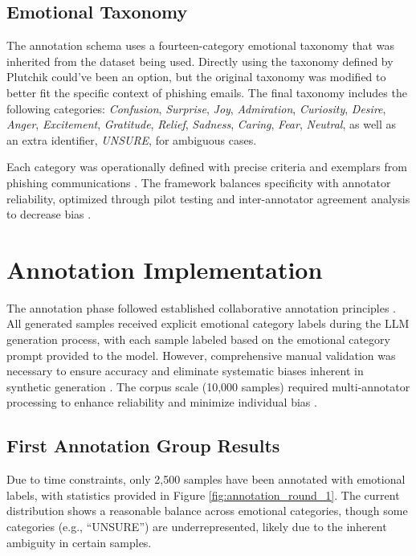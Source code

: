 \subsection{Emotional Taxonomy}

The annotation schema uses a fourteen-category emotional taxonomy that was inherited from the dataset being used. Directly using the taxonomy defined by Plutchik\cite{ekman1992argument, plutchik2001nature} could've been an option, but the original taxonomy was modified to better fit the specific context of phishing emails. The final taxonomy includes the following categories: \textit{Confusion}, \textit{Surprise}, \textit{Joy}, \textit{Admiration}, \textit{Curiosity}, \textit{Desire}, \textit{Anger}, \textit{Excitement}, \textit{Gratitude}, \textit{Relief}, \textit{Sadness}, \textit{Caring}, \textit{Fear}, \textit{Neutral}, as well as an extra identifier, \textit{UNSURE}, for ambiguous cases. 

Each category was operationally defined with precise criteria and exemplars from phishing communications \cite{mohammad2013crowdsourcing}. The framework balances specificity with annotator reliability, optimized through pilot testing and inter-annotator agreement analysis to decrease bias \cite{artstein2005bias}.

\section{Annotation Implementation}

The annotation phase followed established collaborative annotation principles \cite{fort2011amazon}. All generated samples received explicit emotional category labels during the LLM generation process, with each sample labeled based on the emotional category prompt provided to the model. However, comprehensive manual validation was necessary to ensure accuracy and eliminate systematic biases inherent in synthetic generation \cite{shirazi2023adversarial}. The corpus scale (10,000 samples) required multi-annotator processing to enhance reliability and minimize individual bias \cite{krippendorff2019content}. 

\subsection{First Annotation Group Results}
Due to time constraints, only 2,500 samples have been annotated with emotional labels, with statistics provided in Figure \ref{fig:annotation_round_1}. The current distribution shows a reasonable balance across emotional categories, though some categories (e.g., ``UNSURE'') are underrepresented, likely due to the inherent ambiguity in certain samples. 

